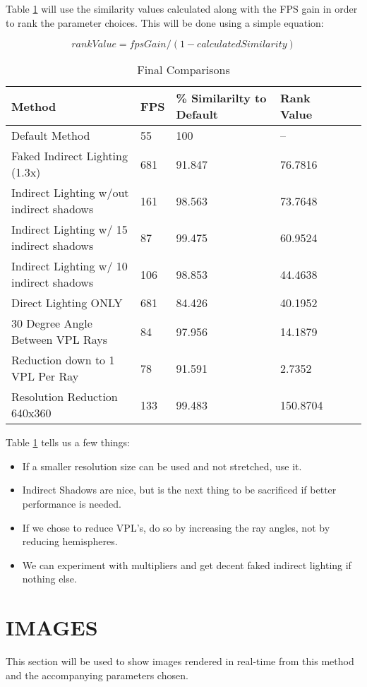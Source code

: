 Table \ref{table:5.10} will use the similarity values calculated along with the FPS gain in order to rank the parameter choices.  This will be done using a simple equation:

\begin{equation}
rankValue = fpsGain / (1-calculatedSimilarity)
\end{equation}

\begin{table}[h!]
	\caption{Final Comparisons}
	\begin{center}
	    \begin{tabular}{ | l | l | l | l | l | l |}
	    \hline
	    Method & FPS & \% Similarilty to Default & Rank Value\\ \hline
	    Default Method & 55 & 100 & --\\ \hline
	    Faked Indirect Lighting (1.3x) & 681 & 91.847 & 76.7816\\ \hline
	    Indirect Lighting w/out indirect shadows & 161 & 98.563 & 73.7648\\ \hline
	    Indirect Lighting w/ 15 indirect shadows & 87 & 99.475 & 60.9524\\ \hline
	    Indirect Lighting w/ 10 indirect shadows & 106 & 98.853 & 44.4638\\ \hline
	    Direct Lighting ONLY & 681 & 84.426 & 40.1952\\ \hline
	    \hline
	    \hline
	    30 Degree Angle Between VPL Rays & 84 & 97.956 & 14.1879\\ \hline
	    \hline
	    \hline
	    Reduction down to 1 VPL Per Ray & 78 & 91.591 & 2.7352\\ \hline
	    \hline
	    \hline
	    Resolution Reduction 640x360 & 133 & 99.483 & 150.8704\\ \hline
	    \end{tabular}
	\end{center}
	\label{table:5.10}
\end{table}

Table \ref{table:5.10} tells us a few things:
\begin{itemize}
\item If a smaller resolution size can be used and not stretched, use it.
\item Indirect Shadows are nice, but is the next thing to be sacrificed if better performance is needed.
\item If we chose to reduce VPL's, do so by increasing the ray angles, not by reducing hemispheres.
\item We can experiment with multipliers and get decent faked indirect lighting if nothing else.
\end{itemize}

\section{IMAGES}
This section will be used to show images rendered in real-time from this method and the accompanying parameters chosen.  

